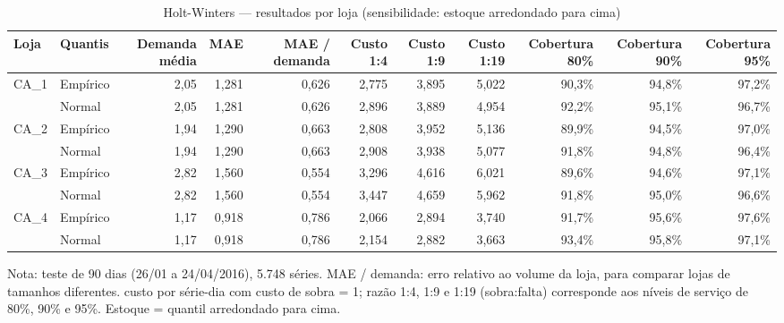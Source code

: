 \begin{table}[htbp]
\centering
\small
\caption{Holt-Winters — resultados por loja (sensibilidade: estoque arredondado para cima)}
\label{tab:hw_por_loja_sensibilidade}
\begin{tabular}{llrrrrrrrrr}
\toprule
Loja & Quantis & Demanda média & MAE & MAE / demanda & Custo 1:4 & Custo 1:9 & Custo 1:19 & Cobertura 80\% & Cobertura 90\% & Cobertura 95\% \\
\midrule
CA\_1 & Empírico & 2,05 & 1,281 & 0,626 & 2,775 & 3,895 & 5,022 & 90,3\% & 94,8\% & 97,2\% \\
 & Normal & 2,05 & 1,281 & 0,626 & 2,896 & 3,889 & 4,954 & 92,2\% & 95,1\% & 96,7\% \\
\addlinespace
CA\_2 & Empírico & 1,94 & 1,290 & 0,663 & 2,808 & 3,952 & 5,136 & 89,9\% & 94,5\% & 97,0\% \\
 & Normal & 1,94 & 1,290 & 0,663 & 2,908 & 3,938 & 5,077 & 91,8\% & 94,8\% & 96,4\% \\
\addlinespace
CA\_3 & Empírico & 2,82 & 1,560 & 0,554 & 3,296 & 4,616 & 6,021 & 89,6\% & 94,6\% & 97,1\% \\
 & Normal & 2,82 & 1,560 & 0,554 & 3,447 & 4,659 & 5,962 & 91,8\% & 95,0\% & 96,6\% \\
\addlinespace
CA\_4 & Empírico & 1,17 & 0,918 & 0,786 & 2,066 & 2,894 & 3,740 & 91,7\% & 95,6\% & 97,6\% \\
 & Normal & 1,17 & 0,918 & 0,786 & 2,154 & 2,882 & 3,663 & 93,4\% & 95,8\% & 97,1\% \\
\bottomrule
\end{tabular}
\par\smallskip
{\footnotesize Nota: teste de 90 dias (26/01 a 24/04/2016), 5.748 séries. MAE / demanda: erro relativo ao volume da loja, para comparar lojas de tamanhos diferentes. custo por série-dia com custo de sobra = 1; razão 1:4, 1:9 e 1:19 (sobra:falta) corresponde aos níveis de serviço de 80\%, 90\% e 95\%. Estoque = quantil arredondado para cima.}
\end{table}
